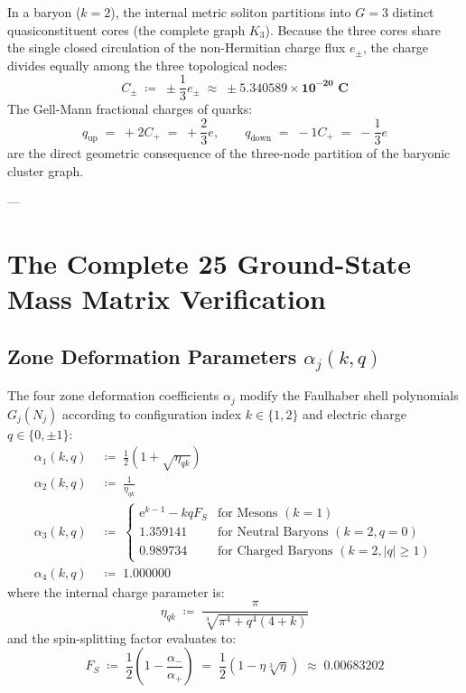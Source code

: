 \documentclass[
    12pt,
    a4paper,
    headings=normal,
    twoside=false,
    open=any,
    parskip=half
]{scrbook}
\newcommand{\eu}{\mathrm{e}}
\begin{document}
In a baryon ($k = 2$), the internal metric soliton partitions into $G = 3$ distinct quasiconstituent cores (the complete graph $K_3$). Because the three cores share the single closed circulation of the non-Hermitian charge flux $e_\pm$, the charge divides equally among the three topological nodes:
\begin{equation}
C_\pm \;\coloneqq\; \pm \frac{1}{3} e_\pm \;\approx\; \pm \mathbf{5.340589 \times 10^{-20} \text{ C}}
\label{eq:ch5_quark_charge_tripartition}
\end{equation}
The Gell-Mann fractional charges of quarks:
\begin{equation}
q_{\text{up}} \;=\; +2 C_+ \;=\; +\frac{2}{3}e, \qquad q_{\text{down}} \;=\; -1 C_+ \;=\; -\frac{1}{3}e
\end{equation}
are the direct geometric consequence of the three-node partition of the baryonic cluster graph.

---

\section{The Complete 25 Ground-State Mass Matrix Verification}
\label{sec:ch5_complete_25_states}

\subsection{Zone Deformation Parameters $\alpha_j(k, q)$}

The four zone deformation coefficients $\alpha_j$ modify the Faulhaber shell polynomials $G_j(N_j)$ according to configuration index $k \in \{1, 2\}$ and electric charge $q \in \{0, \pm 1\}$:
\begin{align}
\alpha_1(k, q) &\;\coloneqq\; \frac{1}{2}\left( 1 + \sqrt{\eta_{qk}} \right) \label{eq:ch5_alpha1_formula_master} \\
\alpha_2(k, q) &\;\coloneqq\; \frac{1}{\eta_{qk}} \label{eq:ch5_alpha2_formula_master} \\
\alpha_3(k, q) &\;\coloneqq\; \begin{cases} \eu^{k-1} - k q F_S & \text{for Mesons } (k = 1) \\ 1.359141 & \text{for Neutral Baryons } (k = 2, q = 0) \\ 0.989734 & \text{for Charged Baryons } (k = 2, |q| \ge 1) \end{cases} \label{eq:ch5_alpha3_formula_master} \\
\alpha_4(k, q) &\;\coloneqq\; 1.000000 \label{eq:ch5_alpha4_formula_master}
\end{align}
where the internal charge parameter is:
\begin{equation}
\eta_{qk} \;\coloneqq\; \frac{\pi}{\sqrt[4]{\pi^4 + q^4(4 + k)}}
\end{equation}
and the spin-splitting factor evaluates to:
\begin{equation}
F_S \;\coloneqq\; \frac{1}{2}\left( 1 - \frac{\alpha_-}{\alpha_+} \right) \;=\; \frac{1}{2}\left( 1 - \eta \sqrt[3]{\eta} \right) \;\approx\; 0.00683202
\end{equation}
\end{document}
